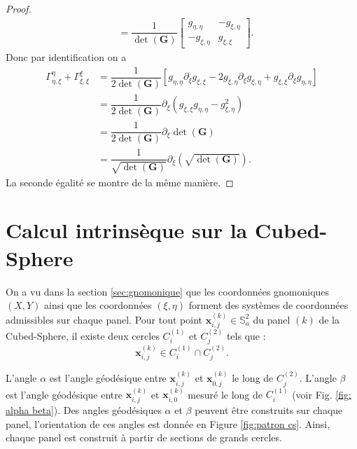 \begin{proof}
\begin{align*}
	& = \dfrac{1}{\det (\mathbf{G}) } \begin{bmatrix}
g_{\eta, \eta} & -g_{\xi, \eta} \\
-g_{\xi, \eta} & g_{\xi, \xi}
\end{bmatrix}.
\end{align*}
Donc par identification on a
\begin{align*}
\Gamma_{\eta, \xi}^{\eta} + \Gamma_{\xi, \xi}^{\xi} & = \dfrac{1}{2 \det (\mathbf{G} )} \left[ g_{\eta, \eta} \partial_{\xi} g_{\xi, \xi} - 2 g_{\xi, \eta} \partial_{\xi} g_{\xi, \eta} + g_{\xi, \xi} \partial_{\xi} g_{\eta, \eta} \right] \\
	& = \dfrac{1}{2 \det (\mathbf{G} )} \partial_{\xi} \left( g_{\xi, \xi} g_{\eta, \eta} - g_{\xi, \eta}^2 \right)\\
	& = \dfrac{1}{2 \det (\mathbf{G} )} \partial_{\xi} \det (\mathbf{G}) \\
	& = \dfrac{1}{\sqrt{\det(\mathbf{G} )}} \partial_{\xi} (\sqrt{\det(\mathbf{G})}).
\end{align*}
La seconde égalité se montre de la même manière.
\end{proof}

















\section{Calcul intrinsèque sur la Cubed-Sphere}

On a vu dans la section \ref{sec:gnomonique} que les coordonnées gnomoniques $(X,Y)$ ainsi que les coordonnées $(\xi,\eta)$ forment des systèmes de coordonnées admissibles sur chaque panel.  Pour tout point $\mathbf{x}_{i,j}^{(k)} \in \mathbb{S}_a^2$ du panel $(k)$ de la Cubed-Sphere, il existe deux cercles $C_i^{(1)}$ et $C_j^{(2)}$ tels que :
\begin{equation}
\mathbf{x}_{i,j}^{(k)} \in C_i^{(1)} \cap C_j^{(2)}.
\end{equation}

L'angle $\alpha$ est l'angle géodésique entre $\mathbf{x}_{i,j}^{(k)}$ et $\mathbf{x}_{0,j}^{(k)}$ le long de $C^{(2)}_j$. L'angle $\beta$ est l'angle géodésique entre $\mathbf{x}_{i,j}^{(k)}$ et $\mathbf{x}_{i,0}^{(k)}$ mesuré le long de $C^{(1)}_i$ (voir Fig. \ref{fig: alpha beta}). Des angles géodésiques $\alpha$ et $\beta$ peuvent être construits sur chaque panel, l'orientation de ces angles est donnée en Figure \ref{fig:patron cs}. Ainsi, chaque panel est construit à partir de sections de grands cercles.

